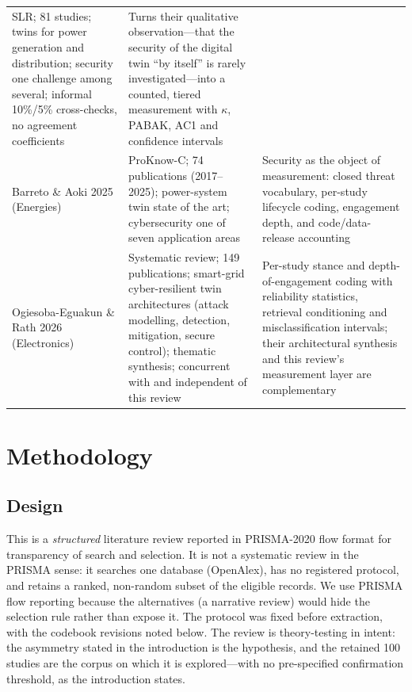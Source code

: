 \documentclass[preprint,12pt]{elsarticle}
\renewcommand{\_}{\plainunderscore\allowbreak}
\begin{document}
\begin{table}[tp]
\begin{tabular}{@{}p{2.9cm}p{5.3cm}p{6.3cm}@{}}
SLR; 81 studies; twins for power generation and distribution; security one challenge
among several; informal 10\%/5\% cross-checks, no agreement coefficients &
Turns their qualitative observation---that the security of the digital twin ``by
itself'' is rarely investigated---into a counted, tiered measurement with $\kappa$,
PABAK, AC1 and confidence intervals \\
\addlinespace
Barreto \& Aoki 2025 (Energies) &
ProKnow-C; 74 publications (2017--2025); power-system twin state of the art;
cybersecurity one of seven application areas &
Security as the object of measurement: closed threat vocabulary, per-study lifecycle
coding, engagement depth, and code/data-release accounting \\
\addlinespace
Ogiesoba-Eguakun \& Rath 2026 (Electronics) &
Systematic review; 149 publications; smart-grid cyber-resilient twin architectures
(attack modelling, detection, mitigation, secure control); thematic synthesis;
concurrent with and independent of this review &
Per-study stance and depth-of-engagement coding with reliability statistics,
retrieval conditioning and misclassification intervals; their architectural
synthesis and this review's measurement layer are complementary \\
\bottomrule
\end{tabular}
\end{table}

\section{Methodology}\label{sec:method}

\subsection{Design}

This is a \emph{structured} literature review reported in PRISMA-2020 flow format for
transparency of search and selection. It is not a systematic review in the PRISMA sense:
it searches one database (OpenAlex), has no registered protocol, and retains a ranked,
non-random subset of the eligible records. We use PRISMA flow reporting because the
alternatives (a narrative review) would hide the selection rule rather than expose it.
The protocol was fixed before extraction, with the codebook revisions noted below. The
review is theory-testing in intent: the asymmetry stated in the introduction is the
hypothesis, and the retained 100 studies are the corpus on which it is explored---with no
pre-specified confirmation threshold, as the introduction states.
\end{document}
